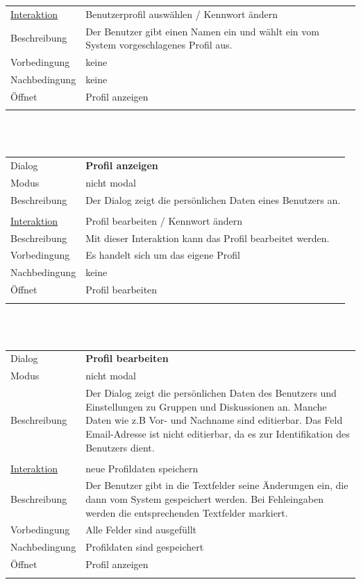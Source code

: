 \documentclass[12pt,a4paper]{article}
\begin{document}
{\begin{tabular}{l p{12cm}}
\underline{Interaktion} 	 & Benutzerprofil auswählen / Kennwort ändern\\ 
Beschreibung   	 & Der Benutzer gibt einen Namen ein und wählt ein vom System vorgeschlagenes Profil aus.\\
Vorbedingung	& keine \\
Nachbedingung	& keine \\
Öffnet			& \glqq Profil anzeigen\grqq \\\\
			
\hline
\end{tabular}\\\\

\begin{tabular}{l p{12cm}}
Dialog 	 & \textbf{Profil anzeigen} \\ 
Modus & nicht modal\\ 
Beschreibung   	 & Der Dialog zeigt die persönlichen Daten eines Benutzers an.\\\\

\underline{Interaktion} 	 & Profil bearbeiten / Kennwort ändern\\ 
Beschreibung   	 & Mit dieser Interaktion kann das Profil bearbeitet werden.\\
Vorbedingung	& Es handelt sich um das eigene Profil \\
Nachbedingung	& keine \\
Öffnet			& \glqq Profil bearbeiten\grqq \\\\
			
\hline
\end{tabular}\\\\

\begin{tabular}{l p{12cm}}
Dialog 	 & \textbf{Profil bearbeiten} \\ 
Modus & nicht modal\\ 
Beschreibung   	 & Der Dialog zeigt die persönlichen Daten des Benutzers und Einstellungen zu Gruppen und Diskussionen an. Manche Daten wie z.B Vor- und Nachname sind editierbar. Das Feld Email-Adresse ist nicht editierbar, da es zur Identifikation des Benutzers dient.\\\\

\underline{Interaktion}  	 & neue Profildaten speichern\\ 
Beschreibung   	 & Der Benutzer gibt in die Textfelder seine Änderungen ein, die dann vom System gespeichert werden. Bei Fehleingaben werden die entsprechenden Textfelder markiert.\\
Vorbedingung   	 & Alle Felder sind ausgefüllt\\
Nachbedingung 	 & Profildaten sind gespeichert\\
Öffnet			 & \glqq Profil anzeigen\grqq\\\\


\end{tabular}}
\end{document}
